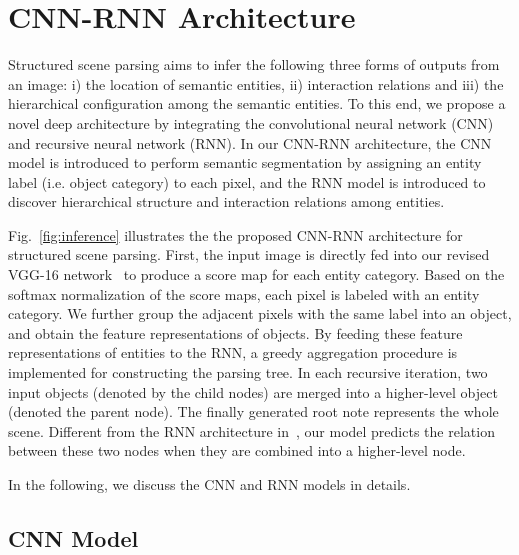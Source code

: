 \documentclass[10pt,twocolumn,letterpaper]{article}
\begin{document}
\section{CNN-RNN Architecture}
\label{CNN-RNN Architecture}

Structured scene parsing aims to infer the following three forms of outputs from an image: i) the location of semantic entities, ii) interaction relations and iii) the hierarchical configuration among the semantic entities. To this end, we propose a novel deep architecture by integrating the convolutional neural network (CNN) and recursive neural network (RNN). In our CNN-RNN architecture, the CNN model is introduced to perform semantic segmentation by assigning an entity label (i.e. object category) to each pixel, and the RNN model is introduced to discover hierarchical structure and interaction relations among entities.

Fig.~\ref{fig:inference} illustrates the the proposed CNN-RNN architecture for structured scene parsing. First, the input image is directly fed into our revised VGG-16 network~\cite{vggnet} to produce a score map for each entity category. Based on the softmax normalization of the score maps, each pixel is labeled with an entity category. We further group the adjacent pixels with the same label into an object, and obtain the feature representations of objects. By feeding these feature representations of entities to the RNN, a greedy aggregation procedure is implemented for  constructing the parsing tree. In each recursive iteration, two input objects (denoted by the child nodes) are merged into a higher-level object (denoted the parent node). The finally generated root note represents the whole scene. Different from the RNN architecture in~\cite{DBLP:Recursive_Socher}\cite{DBLP:RecursiveContext2}, our model predicts the relation between these two nodes when they are combined into a higher-level node.

In the following, we discuss the CNN and RNN models in details.














\subsection{CNN Model}
\label{sub:cnn_model}
\end{document}
